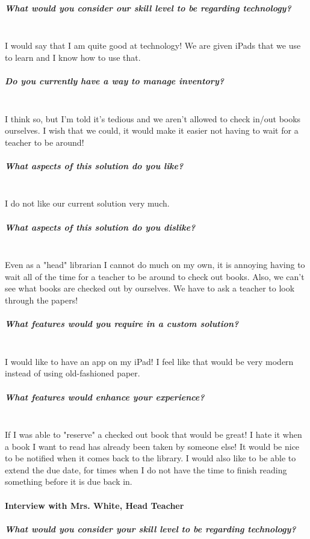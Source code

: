 \documentclass[../../../main.tex]{subfiles}
\begin{document}
\subparagraph{What would you consider our skill level to be regarding technology?}

\noindent \\ I would say that I am quite good at technology! We are given iPads that we use to learn and I know how to use that.

\subparagraph{Do you currently have a way to manage inventory?}

\noindent \\ I think so, but I'm told it's tedious and we aren't allowed to check in/out books ourselves. I wish that we could, it would make it easier not having to wait for a teacher to be around!

\subparagraph{What aspects of this solution do you like?}

\noindent \\ I do not like our current solution very much.

\subparagraph{What aspects of this solution do you dislike?}

\noindent \\ Even as a "head" librarian I cannot do much on my own, it is annoying having to wait all of the time for a teacher to be around to check out books.
Also, we can't see what books are checked out by ourselves. We have to ask a teacher to look through the papers!

\subparagraph{What features would you require in a custom solution?}

\noindent \\ I would like to have an app on my iPad! I feel like that would be very modern instead of using old-fashioned paper.

\subparagraph{What features would enhance your experience?}

\noindent \\ If I was able to "reserve" a checked out book that would be great! I hate it when a book I want to read has already been taken by someone else! It would be nice to be notified when it comes back to the library.
I would also like to be able to extend the due date, for times when I do not have the time to finish reading something before it is due back in.

\paragraph{Interview with Mrs. White, Head Teacher}

\subparagraph{What would you consider your skill level to be regarding technology?}
\end{document}
